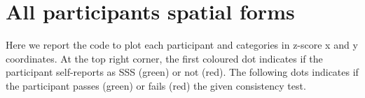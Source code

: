 \documentclass[
  man,
  floatsintext,
  longtable,
  a4paper,
  nolmodern,
  notxfonts,
  notimes,
  colorlinks=true,linkcolor=blue,citecolor=blue,urlcolor=blue]{apa7}
\begin{document}
\section{All participants spatial
forms}\label{apx-all-participants-spatial-forms}

Here we report the code to plot each participant and categories in
z-score x and y coordinates. At the top right corner, the first coloured
dot indicates if the participant self-reports as SSS (green) or not
(red). The following dots indicates if the participant passes (green) or
fails (red) the given consistency test.
\end{document}
